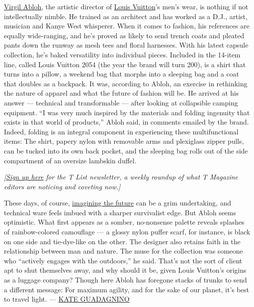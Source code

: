 \href{https://www.nytimes3xbfgragh.onion/2018/03/02/t-magazine/virgil-abloh-off-white-paris-fashion-week.html}{Virgil
Abloh}, the artistic director of
\href{https://www.louisvuitton.com/}{Louis Vuitton}'s men's wear, is
nothing if not intellectually nimble. He trained as an architect and has
worked as a D.J., artist, musician and Kanye West whisperer. When it
comes to fashion, his references are equally wide-ranging, and he's
proved as likely to send trench coats and pleated pants down the runway
as mesh tees and floral harnesses. With his latest capsule collection,
he's baked versatility into individual pieces. Included in the 14-item
line, called Louis Vuitton 2054 (the year the brand will turn 200), is a
shirt that turns into a pillow, a weekend bag that morphs into a
sleeping bag and a coat that doubles as a backpack. It was, according to
Abloh, an exercise in rethinking the nature of apparel and what the
future of fashion will be. He arrived at his answer --- technical and
transformable --- after looking at collapsible camping equipment. ``I
was very much inspired by the materials and folding ingenuity that
exists in that world of products,'' Abloh said, in comments emailed by
the brand. Indeed, folding is an integral component in experiencing
these multifunctional items: The shirt, papery nylon with removable arms
and plexiglass zipper pulls, can be tucked into its own back pocket, and
the sleeping bag rolls out of the side compartment of an oversize
lambskin duffel.

\emph{{[}}\href{https://www.nytimes3xbfgragh.onion/newsletters/t-list?module=inline}{\emph{Sign
up here}} \emph{for the T List newsletter, a weekly roundup of what T
Magazine editors are noticing and coveting now.{]}}

These days, of course,
\href{https://www.nytimes3xbfgragh.onion/interactive/2019/04/10/t-magazine/humberto-leon-carol-lim.html}{imagining
the future} can be a grim undertaking, and technical ware feels imbued
with a sharper survivalist edge. But Abloh seems optimistic. What first
appears as a somber, no-nonsense palette reveals splashes of
rainbow-colored camouflage --- a glossy nylon puffer scarf, for
instance, is black on one side and tie-dye-like on the other. The
designer also retains faith in the relationship between man and nature.
The muse for the collection was someone who ``actively engages with the
outdoors,'' he said. That's not the sort of client apt to shut
themselves away, and why should it be, given Louis Vuitton's origins as
a luggage company? Though here Abloh has foregone stacks of trunks to
send a different message: For maximum agility, and for the sake of our
planet, it's best to travel light. ---
\href{https://www.nytimes3xbfgragh.onion/by/kate-guadagnino}{KATE
GUADAGNINO}

